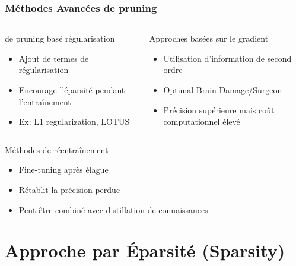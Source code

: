 \documentclass[10pt]{beamer}
\begin{document}
\begin{frame}
\frametitle{Méthodes Avancées de pruning}
\begin{columns}
\begin{column}{0.5\textwidth}
\begin{block}{de pruning basé régularisation}
\begin{itemize}
    \item Ajout de termes de régularisation
    \item Encourage l'éparsité pendant l'entraînement
    \item Ex: L1 regularization, LOTUS
\end{itemize}
\end{block}
\end{column}
\begin{column}{0.5\textwidth}
\begin{block}{Approches basées sur le gradient}
\begin{itemize}
    \item Utilisation d'information de second ordre
    \item Optimal Brain Damage/Surgeon
    \item Précision supérieure mais coût computationnel élevé
\end{itemize}
\end{block}
\end{column}
\end{columns}

\begin{block}{Méthodes de réentraînement}
\begin{itemize}
    \item Fine-tuning après élague
    \item Rétablit la précision perdue
    \item Peut être combiné avec distillation de connaissances
\end{itemize}
\end{block}
\end{frame}

\section{Approche par Éparsité (Sparsity)}
\end{document}

